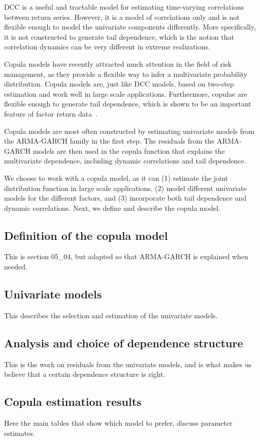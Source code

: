 DCC is a useful and tractable model for estimating time-varying correlations between return series. However, it is a model of correlations only and is not flexible enough to model the univariate components differently. More specifically, it is not constructed to generate tail dependence, which is the notion that correlation dynamics can be very different in extreme realizations. 

Copula models have recently attracted much attention in the field of risk management, as they provide a flexible way to infer a multivariate probability distribution. Copula models are, just like DCC models, based on two-step estimation and work well in large scale applications. Furthermore, copulae are flexible enough to generate tail dependence, which is shown to be an important feature of factor return data~\autocite{ChristoffersenLanglois2013}. 

Copula models are most often constructed by estimating univariate models from the ARMA-GARCH family in the first step. The residuals from the ARMA-GARCH models are then used in the copula function that explains the multivariate dependence, including dynamic correlations and tail dependence.

We choose to work with a copula model, as it can (1) estimate the joint distribution function in large scale applications, (2) model different univariate models for the different factors, and (3) incorporate both tail dependence and dynamic correlations. Next, we define and describe the copula model.

\subsection{Definition of the copula model}
This is section 05_04, but adapted so that ARMA-GARCH is explained when needed.
\subsection{Univariate models}
This describes the selection and estimation of the univariate models.
\subsection{Analysis and choice of dependence structure}
This is the work on residuals from the univariate models, and is what makes us believe that a certain dependence structure is right.
\subsection{Copula estimation results}
Here the main tables that show which model to prefer, discuss parameter estimates.
